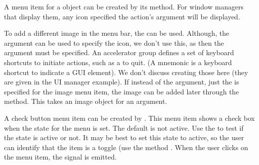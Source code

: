 A menu item for a  object can be created by its
 method. For window managers that
display them, any icon specified the action's  argument
will be displayed.


To add a different image in the menu bar, the
 can be used. Although, the
 argument can be used to specify
the icon, we don't use this, as then the argument
 must be specified. An
accelerator group defines a set of keyboard shortcuts to initiate
actions, such as a  to quit. (A mnemonic is a keyboard
shortcut to indicate a GUI element). We don't discuss creating those
here (they are given in the UI manager example). If instead of the
 argument, just the  is specified for the
image menu item, the image can be added later through the
 method. This takes an image object
for an argument. 

A check button menu item can be created by
. This menu item shows a check box when
the  state for the menu is set. The default is not
active. Use the  to test if the
state is active or not.  It may be best to set this state to active,
so the user can identify that the item is a toggle (use the method
. When the user clicks on the menu item, the
 signal is emitted.

